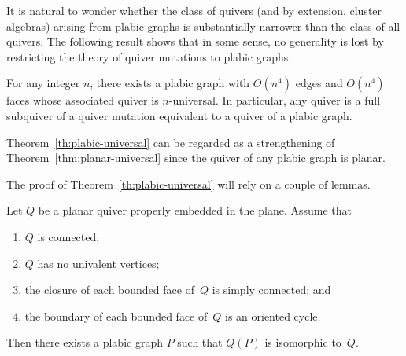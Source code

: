 It is natural to wonder whether the class of quivers (and by extension, cluster algebras)
arising from plabic graphs is substantially narrower than the class of all quivers. 
The following result shows that in some sense, no generality is lost 
by restricting the theory of quiver mutations to plabic graphs:

\begin{theorem}
\label{th:plabic-universal}
For any integer $n$, there exists a plabic graph with $O(n^4)$ edges and $O(n^4)$ faces 
whose associated quiver is $n$-universal. 
In particular, any quiver is a full subquiver of a quiver
mutation equivalent to a quiver of a plabic graph. 
\end{theorem}

Theorem~\ref{th:plabic-universal}
can be regarded as a strengthening of Theorem~\ref{thm:planar-universal} 
since the quiver of any plabic graph is planar.

The proof of Theorem~\ref{th:plabic-universal} will rely on a couple of lemmas.

\goodbreak
\begin{lemma}
\label{lem:quivers-from-plabic}
Let $Q$ be a planar quiver properly embedded in the plane. 
Assume that 
\begin{enumerate}[label=(\alph*)]
\item\label{lemma3.7_a} %
$Q$ is connected; 
\item\label{lemma3.7_b} %
$Q$ has no univalent vertices; 
\item\label{lemma3.7_c} %
the closure of each bounded face of~$Q$ is simply connected; and 
\item\label{lemma3.7_d} %
the boundary of each bounded face of~$Q$ is an oriented cycle.
\end{enumerate}
Then %
there exists a plabic graph $P$ such that $Q(P)$ is isomorphic to~$Q$. 
\end{lemma}

